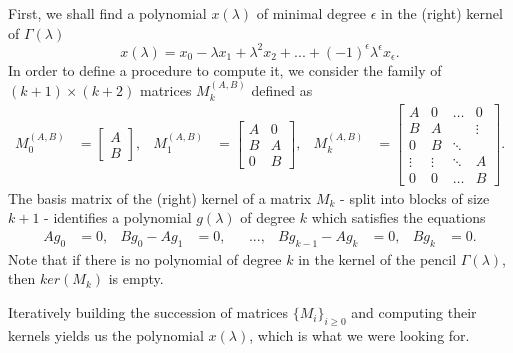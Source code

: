 First, we shall find a polynomial \(x(\lambda)\) of minimal degree \(\epsilon\) in the (right) kernel
of \(\Gamma(\lambda)\)
\[
    x(\lambda) = x_{0} - \lambda x_{1} + \lambda^2 x_{2} + ... + (-1)^\epsilon \lambda^\epsilon x_{\epsilon}.
\]
In order to define a procedure to compute it, we consider the family of \((k+1) \times (k+2)\) matrices
\(M_{k}^{(A, B)}\) defined as
\begin{align*}
    M_{0}^{(A, B)} &=
        \begin{bmatrix}
            A \\
            B
        \end{bmatrix},
    & M_{1}^{(A, B)} &=
        \begin{bmatrix}
            A & 0 \\
            B & A \\
            0 & B
        \end{bmatrix},
    & M_{k}^{(A, B)} &=
        \begin{bmatrix}
            A & 0 & \hdots &    0   \\
            B & A &        & \vdots \\
            0 & B & \ddots & \\
            \vdots & \vdots & \ddots & A \\
            0      &    0   & \hdots & B
        \end{bmatrix}.
\end{align*}
The basis matrix of the (right) kernel of a matrix \(M_{k}\) - split into blocks of size \(k+1\) - identifies
a polynomial \(g(\lambda)\) of degree \(k\) which satisfies the equations
\begin{align*}
   Ag_{0} &= 0, &
   Bg_{0} - Ag_{1} &= 0, &
   & ..., &
   Bg_{k-1} - Ag_{k} &= 0, &
   Bg_{k} &= 0.
\end{align*}
Note that if there is no polynomial of degree \(k\) in the kernel of the pencil
\(\Gamma(\lambda)\), then \(ker(M_{k})\) is empty.

Iteratively building the succession of matrices \(\{M_{i}\}_{i \geq 0}\) and computing their kernels
yields us the polynomial \(x(\lambda)\), which is what we were looking for.

